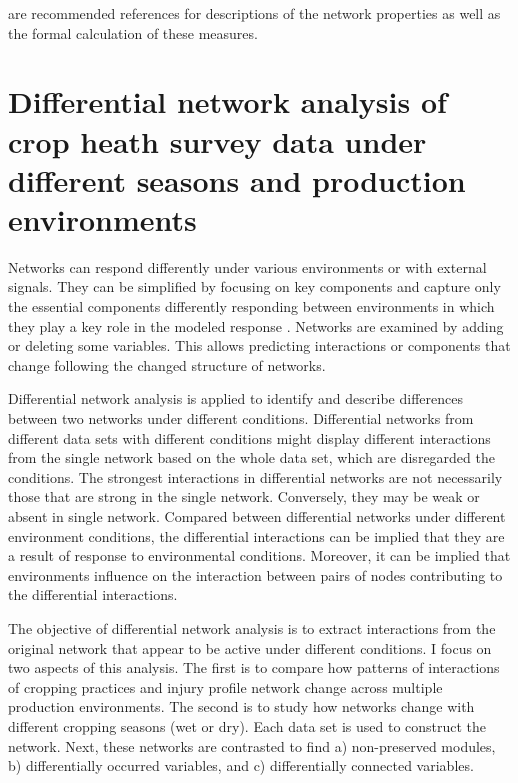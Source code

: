  are recommended references for descriptions of the network properties as well as the formal calculation of these measures.

\section*{Differential network analysis of crop heath survey data under different seasons and production environments}



Networks can respond differently under various environments or with external signals. They can be simplified by focusing on key components and capture only the essential components differently responding between environments in which they play a key role in the modeled response . Networks are examined by adding or deleting some variables. This allows predicting interactions or components that change following the changed structure of networks. 

Differential network analysis is applied to identify and describe differences between two networks under different conditions. Differential networks from different data sets with different conditions might display different interactions from the single network based on the whole data set, which are disregarded the conditions. The strongest interactions in differential networks are not necessarily those that are strong in the single network. Conversely, they may be weak or absent in single network. Compared between differential networks under different environment conditions, the differential interactions can be implied that they are a result of response to environmental conditions. Moreover, it can be implied that environments influence on the interaction between pairs of nodes contributing to the differential interactions. 

The objective of differential network analysis is to extract interactions from the original network that appear to be active under different conditions. I focus on two aspects of this analysis. The first is to compare how patterns of interactions of cropping practices and injury profile network change across multiple production environments. The second is to study how networks change with different cropping seasons (wet or dry). Each data set is used to construct the network. Next, these networks are contrasted to find a) non-preserved modules, b) differentially occurred variables, and c) differentially connected variables.

